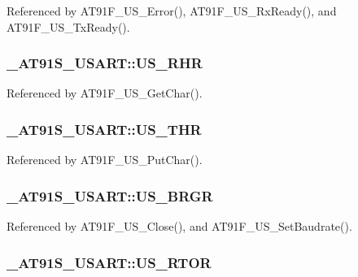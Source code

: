 Referenced by AT91F\_\-US\_\-Error(), AT91F\_\-US\_\-RxReady(), and AT91F\_\-US\_\-TxReady().\hypertarget{struct__AT91S__USART_08ea9921359c45c640b6911fda1dddfb}{
\subsubsection{ {\bf \_\-AT91S\_\-USART::US\_\-RHR}}}
\label{struct__AT91S__USART_08ea9921359c45c640b6911fda1dddfb}




Referenced by AT91F\_\-US\_\-GetChar().\hypertarget{struct__AT91S__USART_8db8959953584eac2c327f2e35bacc73}{
\subsubsection{ {\bf \_\-AT91S\_\-USART::US\_\-THR}}}
\label{struct__AT91S__USART_8db8959953584eac2c327f2e35bacc73}




Referenced by AT91F\_\-US\_\-PutChar().\hypertarget{struct__AT91S__USART_dc6949ccb9b40260d28130e73a6dabcc}{
\subsubsection{ {\bf \_\-AT91S\_\-USART::US\_\-BRGR}}}
\label{struct__AT91S__USART_dc6949ccb9b40260d28130e73a6dabcc}




Referenced by AT91F\_\-US\_\-Close(), and AT91F\_\-US\_\-SetBaudrate().\hypertarget{struct__AT91S__USART_f0fcbe1b1fb83dedd5311cdcb45138cc}{
\subsubsection{ {\bf \_\-AT91S\_\-USART::US\_\-RTOR}}}
\label{struct__AT91S__USART_f0fcbe1b1fb83dedd5311cdcb45138cc}


